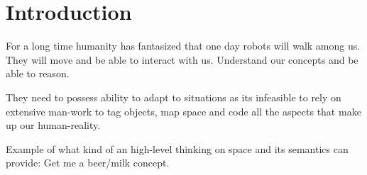 

\chapter{Introduction}
For a long time humanity has fantasized that one day robots will walk among us.
They will move and be able to interact with us. Understand our concepts and
be able to reason.

They need to possess ability to adapt to situations as its infeasible to rely
on extensive man-work to tag objects, map space and code all the aspects that
make up our human-reality.

%


%



Example of what kind of an high-level thinking on space and its semantics can
provide: Get me a beer/milk concept.

%
%
%
%


